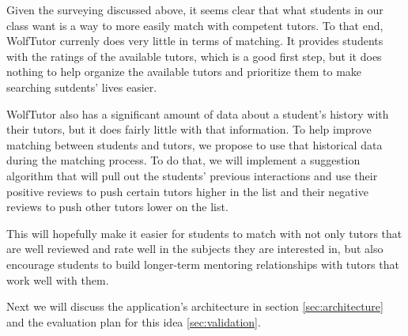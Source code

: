 
Given the surveying discussed above, it seems clear that what students
in our class want is a way to more easily match with competent
tutors.  To that end, WolfTutor currenly does very little in terms of
matching.  It provides students with the ratings of the available
tutors, which is a good first step, but it does nothing to help
organize the available tutors and prioritize them to make searching
sutdents' lives easier.  

WolfTutor also has a significant amount of data about a student's
history with their tutors, but it does fairly little with that
information.  To help improve matching between students and tutors, we
propose to use that historical data during the matching process. To do
that, we will implement a suggestion algorithm that will pull out the
students' previous interactions and use their positive reviews to push
certain tutors higher in the list and their negative reviews to push
other tutors lower on the list.

This will hopefully make it easier for students to match with not only
tutors that are well reviewed and rate well in the subjects they are
interested in, but also encourage students to build longer-term
mentoring relationships with tutors that work well with them.  

Next we will discuss the application's architecture in section
\ref{sec:architecture} and the evaluation plan for this idea \ref{sec:validation}.
